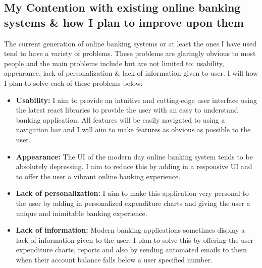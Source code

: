 \subsection{My Contention with existing online banking systems \& how I plan to improve upon them}
The current generation of online banking systems or at least the ones I have used
tend to have a variety of problems.  These problems are glaringly obvious to most
people and the main problems include but are not limited to: usability, appearance, lack of
personalization \& lack of information given to user.  I will how I plan to solve each of
these problems below:
\begin{itemize}
\item \textbf{Usability:} I aim to provide an intuitive and cutting-edge user
interface using the latest react libraries to provide the user with an easy to
understand banking application.  All features will be easily navigated to using
a navigation bar and I will aim to make features as obvious as possible to the user.
\item \textbf{Appearance:} The UI of the modern day online banking system tends
to be absolutely depressing.  I aim to reduce this by adding in a responsive UI
and to offer the user a vibrant online banking experience.
\item \textbf{Lack of personalization:} I aim to make this application very personal
to the user by adding in personalized expenditure charts and giving the user a
unique and inimitable banking experience.
\item \textbf{Lack of information:} Modern banking applications sometimes display
a lack of information given to the user.  I plan to solve this by offering the user
expenditure charts, reports and also by sending automated emails to them when
their account balance falls below a user specified number.
\end{itemize}
